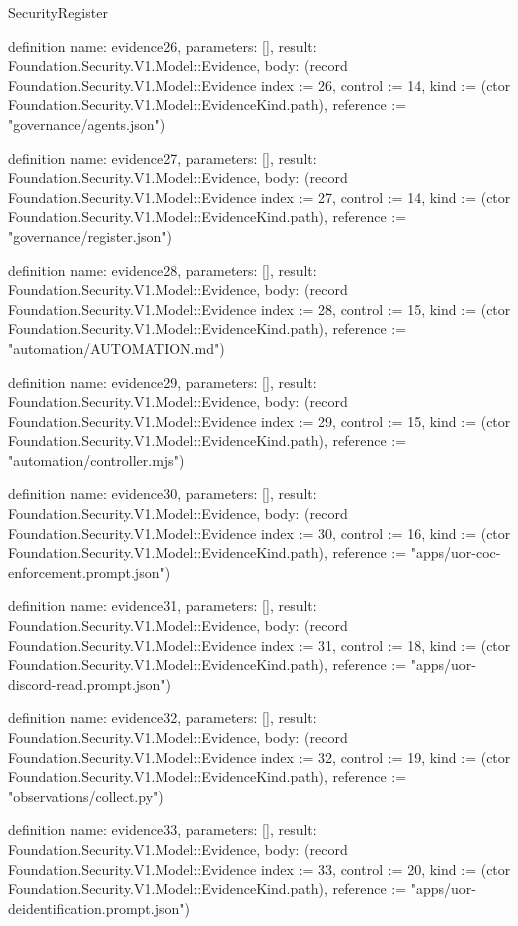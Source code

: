 \begin{lexlean}{SecurityRegister}
\begin{semanticmodule}
definition{
  name: evidence26,
  parameters: [],
  result: Foundation.Security.V1.Model::Evidence,
  body: (record Foundation.Security.V1.Model::Evidence {index := 26, control := 14, kind := (ctor Foundation.Security.V1.Model::EvidenceKind.path), reference := "governance/agents.json"})
}

definition{
  name: evidence27,
  parameters: [],
  result: Foundation.Security.V1.Model::Evidence,
  body: (record Foundation.Security.V1.Model::Evidence {index := 27, control := 14, kind := (ctor Foundation.Security.V1.Model::EvidenceKind.path), reference := "governance/register.json"})
}

definition{
  name: evidence28,
  parameters: [],
  result: Foundation.Security.V1.Model::Evidence,
  body: (record Foundation.Security.V1.Model::Evidence {index := 28, control := 15, kind := (ctor Foundation.Security.V1.Model::EvidenceKind.path), reference := "automation/AUTOMATION.md"})
}

definition{
  name: evidence29,
  parameters: [],
  result: Foundation.Security.V1.Model::Evidence,
  body: (record Foundation.Security.V1.Model::Evidence {index := 29, control := 15, kind := (ctor Foundation.Security.V1.Model::EvidenceKind.path), reference := "automation/controller.mjs"})
}

definition{
  name: evidence30,
  parameters: [],
  result: Foundation.Security.V1.Model::Evidence,
  body: (record Foundation.Security.V1.Model::Evidence {index := 30, control := 16, kind := (ctor Foundation.Security.V1.Model::EvidenceKind.path), reference := "apps/uor-coc-enforcement.prompt.json"})
}

definition{
  name: evidence31,
  parameters: [],
  result: Foundation.Security.V1.Model::Evidence,
  body: (record Foundation.Security.V1.Model::Evidence {index := 31, control := 18, kind := (ctor Foundation.Security.V1.Model::EvidenceKind.path), reference := "apps/uor-discord-read.prompt.json"})
}

definition{
  name: evidence32,
  parameters: [],
  result: Foundation.Security.V1.Model::Evidence,
  body: (record Foundation.Security.V1.Model::Evidence {index := 32, control := 19, kind := (ctor Foundation.Security.V1.Model::EvidenceKind.path), reference := "observations/collect.py"})
}

definition{
  name: evidence33,
  parameters: [],
  result: Foundation.Security.V1.Model::Evidence,
  body: (record Foundation.Security.V1.Model::Evidence {index := 33, control := 20, kind := (ctor Foundation.Security.V1.Model::EvidenceKind.path), reference := "apps/uor-deidentification.prompt.json"})
}


\end{semanticmodule}
\end{lexlean}
